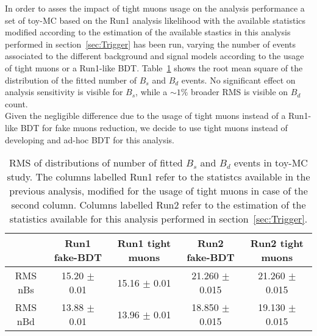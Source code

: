 In order to asses the impact of tight muons usage on the analysis performance a set of toy-MC 
based on the Run1 analysis likelihood with the available statistics modified according 
to the estimation of the available stastics in this analysis performed in section~\ref{sec:Trigger} 
has been run, varying the number of events associated to the different background and signal models according to the usage of tight muons 
or a Run1-like BDT. Table~\ref{table:tightMuAndBDTRMS} shows the root mean square of the distribution 
of the fitted number of $B_s$ and $B_d$ events. No significant effect on analysis sensitivity is 
visible for $B_s$, while a $\sim 1\%$ broader RMS is visible on $B_d$ count.\\
Given the negligible difference due to the usage of tight muons instead of a Run1-like BDT for fake 
muons reduction, we decide to use tight muons instead of developing and ad-hoc BDT for this analysis.
\begin{table}[h]
  \begin{center}
    \begin{tabular}{| c | c | c || c | c |}
      \hline
      &Run1 fake-BDT&Run1 tight muons&Run2 fake-BDT&Run2 tight muons\\ \hline
      RMS nBs&15.20 $\pm$ 0.01&15.16 $\pm$ 0.01&21.260 $\pm$ 0.015&21.260 $\pm$ 0.015\\ \hline
      RMS nBd&13.88 $\pm$ 0.01&13.96 $\pm$ 0.01&18.850 $\pm$ 0.015&19.130 $\pm$ 0.015\\ \hline
    \end{tabular}
    \caption{RMS of distributions of number of fitted $B_s$ and $B_d$ events in toy-MC study. The columns labelled Run1 
      refer to the statistcs available in the previous analysis, modified for the usage of tight muons in case of the 
    second column. Columns labelled Run2 refer to the estimation of the statistics available for this analysis performed in section~\ref{sec:Trigger}.}
    \label{table:tightMuAndBDTRMS}
  \end{center}
\end{table}
\clearpage
